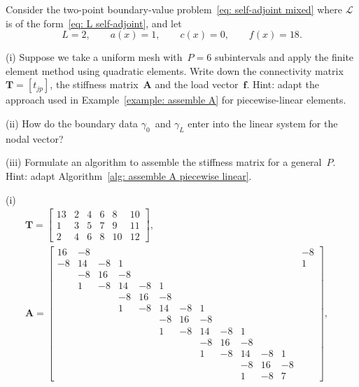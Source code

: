 \begin{Exercises}
\exercise\label{ex: assemble quadratic 1d}
Consider the two-point boundary-value problem~\eqref{eq: self-adjoint mixed} 
where $\mathcal{L}$ is of the form~\eqref{eq: L self-adjoint}, and let
\[
L=2,\qquad a(x)=1,\qquad c(x)=0,\qquad f(x)=18.
\]
\begin{description}
\item{(i)} Suppose we take a uniform mesh with~$P=6$ subintervals and apply the 
finite element method using quadratic elements.  Write down the connectivity 
matrix~$\boldsymbol{T}=[t_{jp}]$, the stiffness matrix~$\boldsymbol{A}$ and 
the load vector~$\boldsymbol{f}$. Hint: adapt the approach used in 
Example~\ref{example: assemble A} for piecewise-linear elements.
\item{(ii)} How do the boundary data $\gamma_0$~and $\gamma_L$ enter into the 
linear system for the nodal vector?
\item{(iii)} Formulate an algorithm to assemble the stiffness matrix for a 
general~$P$.  Hint: adapt Algorithm~\ref{alg: assemble A piecewise linear}.
\end{description}
\begin{ans}
(i) 
\begin{gather*}
\boldsymbol{T}=\begin{bmatrix}
13& 2& 4& 6& 8&10\\
 1& 3& 5& 7& 9&11\\
 2& 4& 6& 8&10&12
\end{bmatrix},\\
\boldsymbol{A}=\left[\begin{array}{cccccccccccc|c}
16&-8&  &  &  &  &  &  &  &  &  &  &-8\\
-8&14&-8& 1&  &  &  &  &  &  &  &  & 1\\
  &-8&16&-8&  &  &  &  &  &  &  &  &  \\
  & 1&-8&14&-8& 1&  &  &  &  &  &  &  \\
  &  &  &-8&16&-8&  &  &  &  &  &  &\\
  &  &  & 1&-8&14&-8& 1&  &  &  &  &  \\
  &  &  &  &  &-8&16&-8&  &  &  &  &  \\
  &  &  &  &  & 1&-8&14&-8& 1&  &  &  \\
  &  &  &  &  &  &  &-8&16&-8&  &  &  \\
  &  &  &  &  &  &  & 1&-8&14&-8& 1&  \\
  &  &  &  &  &  &  &  &  &-8&16&-8&  \\
  &  &  &  &  &  &  &  &  & 1&-8& 7&
\end{array}\right],\quad

\end{gather*}
\end{ans}
\end{Exercises}
